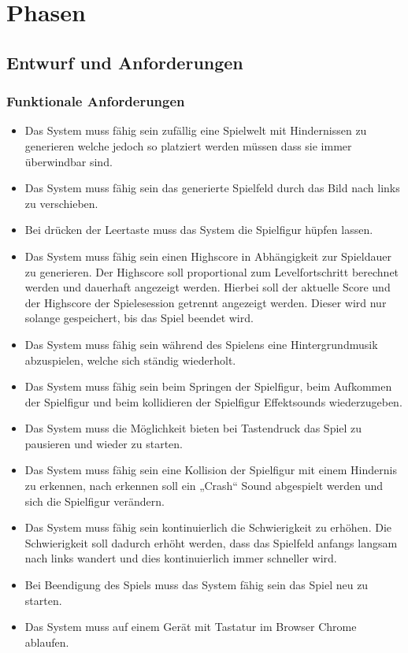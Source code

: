 \chapter{Phasen}
\section{Entwurf und Anforderungen}
\subsection{Funktionale Anforderungen}
\begin{itemize}
	\item Das System muss fähig sein zufällig eine Spielwelt mit Hindernissen zu generieren welche jedoch so platziert werden müssen dass sie immer überwindbar sind.
	\item Das System muss fähig sein das generierte Spielfeld durch das Bild nach links zu verschieben.
	\item Bei drücken der Leertaste muss das System die Spielfigur hüpfen lassen.
	\item Das System muss fähig sein einen Highscore in Abhängigkeit zur Spieldauer zu generieren. Der Highscore soll proportional zum Levelfortschritt berechnet werden und dauerhaft angezeigt werden. Hierbei soll der aktuelle Score und der Highscore der Spielesession getrennt angezeigt werden. Dieser wird nur solange gespeichert, bis das Spiel beendet wird.
	\item Das System muss fähig sein während des Spielens eine Hintergrundmusik abzuspielen, welche sich ständig wiederholt.
	\item Das System muss fähig sein beim Springen der Spielfigur, beim Aufkommen der Spielfigur und beim kollidieren der Spielfigur Effektsounds   wiederzugeben.
	\item Das System muss die Möglichkeit bieten bei Tastendruck das Spiel zu pausieren und wieder zu starten.
	\item Das System muss fähig sein eine Kollision der Spielfigur mit einem Hindernis zu erkennen, nach erkennen soll ein „Crash“ Sound abgespielt werden und sich die Spielfigur verändern.
	\item Das System muss fähig sein kontinuierlich die Schwierigkeit zu erhöhen. Die Schwierigkeit soll dadurch erhöht werden, dass das Spielfeld anfangs langsam nach links wandert und dies kontinuierlich immer schneller wird.
	\item Bei Beendigung des Spiels muss das System fähig sein das Spiel neu zu starten. 
	\item Das System muss auf einem Gerät mit Tastatur im Browser Chrome ablaufen.
\end{itemize}
